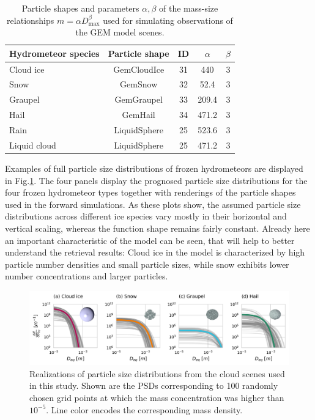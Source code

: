 \documentclass[journal abbreviation, manuscript]{copernicus}
\begin{document}
\begin{table}
  \centering
  \begin{tabular}{l|c|c|c|c}
    Hydrometeor species & Particle shape & ID & $\alpha$ & $\beta$ \\
    \hline
    Cloud ice    & GemCloudIce  & 31 & 440   & 3 \\
    Snow         & GemSnow      & 32 & 52.4  & 3 \\
    Graupel      & GemGraupel   & 33 & 209.4 & 3 \\
    Hail         & GemHail      & 34 & 471.2 & 3 \\
    Rain         & LiquidSphere & 25 & 523.6 & 3 \\
    Liquid cloud & LiquidSphere & 25 & 471.2 & 3 \\
  \end{tabular}
  \caption{Particle shapes and parameters $\alpha, \beta$ of the mass-size relationships
    $m = \alpha D_\text{max}^\beta$ used for simulating observations of the GEM model scenes.}
  \label{tab:species_parameters}
\end{table}

Examples of full particle size distributions of frozen hydrometeors are
displayed in Fig.\ref{fig:gem_psds}. The four panels display the prognosed
particle size distributions for the four frozen hydrometeor types together with
renderings of the particle shapes used in the forward simulations. As these
plots show, the assumed particle size distributions across different ice species
vary mostly in their horizontal and vertical scaling, whereas the function shape
remains fairly constant. Already here an important characteristic of the model
can be seen, that will help to better understand the retrieval results: Cloud
ice in the model is characterized by high particle number densities and small
particle sizes, while snow exhibits lower number concentrations and larger
particles.


\begin{figure}[h!]
\centering
\includegraphics[width = \textwidth]{../plots/gem_hydrometeors.png}
\caption{Realizations of particle size distributions from the cloud scenes used in
this study. Shown are the PSDs corresponding to 100 randomly chosen grid points at
which the mass concentration was higher than $10^{-5}$. Line color encodes the
corresponding mass density.}
\label{fig:gem_psds}
\end{figure}
\end{document}
